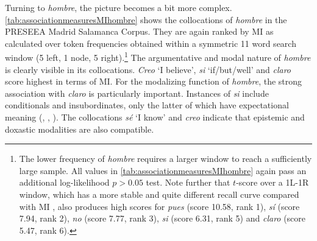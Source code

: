Turning to \textit{hombre}, the picture becomes a bit more complex. \autoref{tab:associationmeasuresMIhombre} shows the collocations of \textit{hombre} in the PRESEEA Madrid Salamanca Corpus. They are again ranked by \ac{MI} as calculated over token frequencies obtained within a symmetric 11 word search window (5 left, 1 node, 5 right).\footnote{The lower frequency of \textit{hombre} requires a larger window to reach a sufficiently large sample. All values in \autoref{tab:associationmeasuresMIhombre} again pass an additional log-likelihood $p>0.05$ test. Note further that $t$-score over a 1L-1R window, which has a more stable and quite different recall curve compared with \ac{MI} \citep[537]{EvertUhrigBartschProisl.2017}, also produces high scores for \textit{pues} (score 10.58, rank 1), \textit{sí} (score 7.94, rank 2), \textit{no} (score 7.77, rank 3), \textit{si} (score 6.31, rank 5) and \textit{claro} (score 5.47, rank 6).} The argumentative and modal nature of \textit{hombre} is clearly visible in its collocations. \textit{Creo} `I believe', \textit{si} `if/but/well' and \textit{claro} score highest in terms of \ac{MI}. For the modalizing function of \textit{hombre}, the strong association with \textit{claro} is particularly important. Instances of \textit{si} include conditionals and insubordinates, only the latter of which have expectational meaning (\cite{Schwenter.2016}, \cite{ElviraGarcia.2016}, ). The collocations \textit{sé} `I know' and \textit{creo} indicate that epistemic and doxastic modalities are also compatible.

